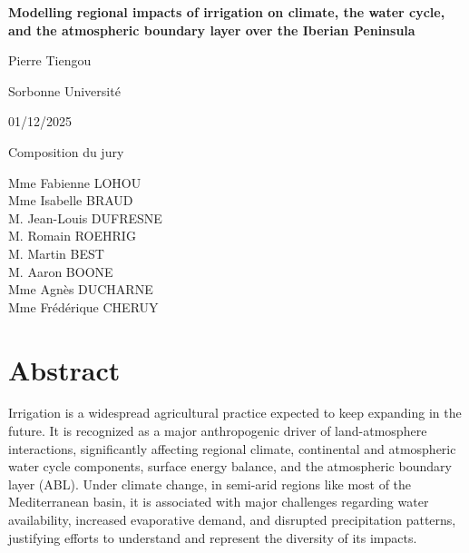 \documentclass{report}
\begin{document}
\begin{titlepage}
    \centering
    \vspace*{2cm}

    {\Huge\bfseries Modelling regional impacts of irrigation on climate, the water cycle, and the atmospheric boundary layer over the Iberian Peninsula\par}
    \vspace{1cm}

    {\Large Pierre Tiengou\par}
    \vspace{0.5cm}

    {\large Sorbonne Université\par}
    \vspace{0.5cm}

    {\large 01/12/2025\par}

    \vfill
    
    {\large Composition du jury \par
        Mme Fabienne LOHOU \\
        Mme Isabelle BRAUD \\
        M. Jean-Louis DUFRESNE \\
        M. Romain ROEHRIG \\
        M. Martin BEST \\
        M. Aaron BOONE \\
        Mme Agnès DUCHARNE \\
        Mme Frédérique CHERUY\\
    }


\end{titlepage}

\section*{Abstract}

Irrigation is a widespread agricultural practice expected to keep expanding in the future. It is recognized as a major anthropogenic driver of land-atmosphere interactions, significantly affecting regional climate, continental and atmospheric water cycle components, surface energy balance, and the atmospheric boundary layer (ABL).
Under climate change, in semi-arid regions like most of the Mediterranean basin, it is associated with major challenges regarding water availability, increased evaporative demand, and disrupted precipitation patterns, justifying efforts to understand and represent the diversity of its impacts.
\end{document}
